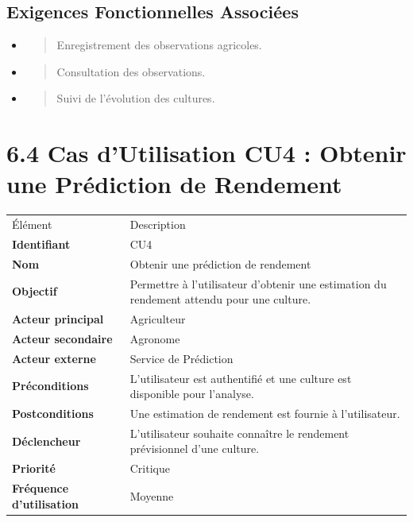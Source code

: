 \documentclass[
]{book}
\begin{document}
\hypertarget{exigences-fonctionnelles-associuxe9es-2}{%
\subsection{Exigences Fonctionnelles
Associées}\label{exigences-fonctionnelles-associuxe9es-2}}

\begin{itemize}
\item
  \begin{quote}
  Enregistrement des observations agricoles.
  \end{quote}
\item
  \begin{quote}
  Consultation des observations.
  \end{quote}
\item
  \begin{quote}
  Suivi de l'évolution des cultures.
  \end{quote}
\end{itemize}

\hypertarget{cas-dutilisation-cu4-obtenir-une-pruxe9diction-de-rendement}{%
\section{6.4 Cas d'Utilisation CU4 : Obtenir une Prédiction de
Rendement}\label{cas-dutilisation-cu4-obtenir-une-pruxe9diction-de-rendement}}

\begin{longtable}[]{@{}ll@{}}
\toprule
\endhead
Élément & Description \\
\textbf{Identifiant} & CU4 \\
\textbf{Nom} & Obtenir une prédiction de rendement \\
\textbf{Objectif} & Permettre à l'utilisateur d'obtenir une estimation
du rendement attendu pour une culture. \\
\textbf{Acteur principal} & Agriculteur \\
\textbf{Acteur secondaire} & Agronome \\
\textbf{Acteur externe} & Service de Prédiction \\
\textbf{Préconditions} & L'utilisateur est authentifié et une culture
est disponible pour l'analyse. \\
\textbf{Postconditions} & Une estimation de rendement est fournie à
l'utilisateur. \\
\textbf{Déclencheur} & L'utilisateur souhaite connaître le rendement
prévisionnel d'une culture. \\
\textbf{Priorité} & Critique \\
\textbf{Fréquence d'utilisation} & Moyenne \\
\bottomrule
\end{longtable}
\end{document}
